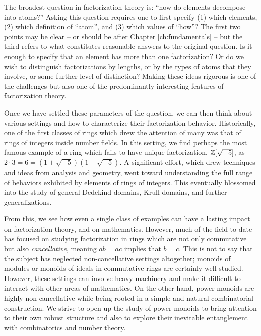 The broadest question in factorization theory is: ``how do elements decompose into atoms?''
Asking this question requires one to first specify (1) which elements, (2) which definition of ``atom'', and (3) which values of ``how''?
The first two points may be clear -- or should be after Chapter \ref{ch:fundamentals} -- but the third refers to what constitutes reasonable answers to the original question.  
Is it enough to specify that an element has more than one factorization? 
Or do we wish to distinguish factorizations by lengths, or by the types of atoms that they involve, or some further level of distinction?
Making these ideas rigorous is one of the challenges but also one of the predominantly interesting features of factorization theory.  

Once we have settled these parameters of the question, we can then think about various settings and how to characterize their factorization behavior.
Historically, one of the first classes of rings which drew the attention of many was that of rings of integers inside number fields.
In this setting, we find perhaps the most famous example of a ring which fails to have unique factorization, $\mathbb{Z}[\sqrt{-5}]$, as $2\cdot3 = 6 = (1+\sqrt{-5})(1-\sqrt{-5})$.
A significant effort, which drew techniques and ideas from analysis and geometry, went toward understanding the full range of behaviors exhibited by elements of rings of integers.
This eventually blossomed into the study of general Dedekind domains, Krull domains, and further generalizations.  

From this, we see how even a single class of examples can have a lasting impact on factorization theory, and on mathematics.
However, much of the field to date has focused on studying factorization in rings which are not only commutative but also \textit{cancellative}, meaning $ab = ac$ implies that $b=c$.
This is not to say that the subject has neglected non-cancellative settings altogether; monoids of modules or monoids of ideals in commutative rings are certainly well-studied.
However, these settings can involve heavy machinery and make it difficult to interact with other areas of mathematics.
On the other hand, power monoids are highly non-cancellative while being rooted in a simple and natural combinatorial construction.
We strive to open up the study of power monoids to bring attention to their own robust structure and also to explore their inevitable entanglement with combinatorics and number theory.  



